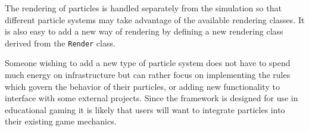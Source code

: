 The rendering of particles is handled separately from the simulation so that
different particle systems may take advantage of the available rendering
classes. It is also easy to add a new way of rendering by defining a new
rendering class derived from the \verb|Render| class.


Someone wishing to add a new type of particle system does not have to spend
much energy on infrastructure but can rather focus on implementing the rules
which govern the behavior of their particles, or adding new functionality to
interface with some external projects. Since the framework is designed for use
in educational gaming it is likely that users will want to integrate particles
into their existing game mechanics.



